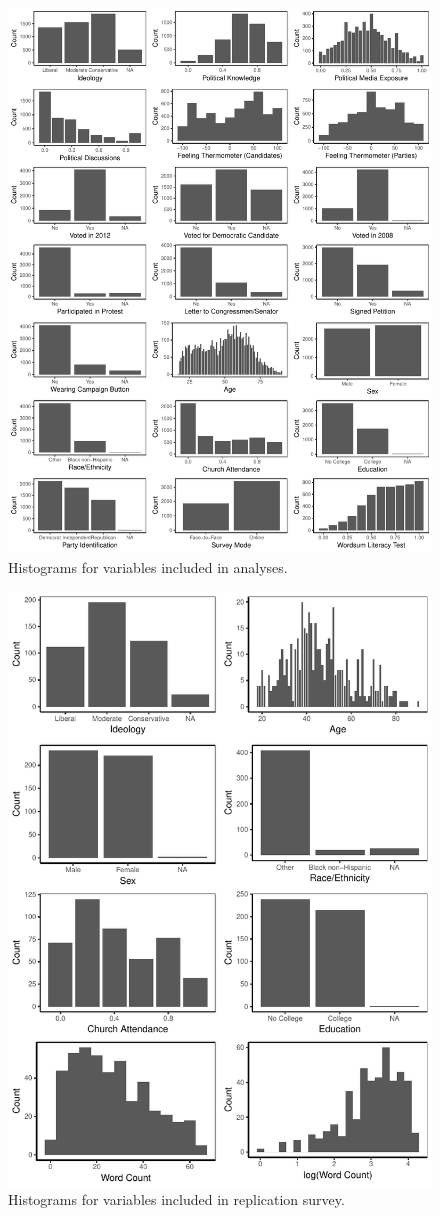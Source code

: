 \documentclass[12pt]{article}
\begin{document}
\begin{figure}[h]\centering
\includegraphics[width=\textwidth]{../calc/fig/app_desc.pdf}
\caption{Histograms for variables included in analyses.}\label{fig:app_desc}
\end{figure}



\begin{figure}[h]\centering
\includegraphics[width=.67\textwidth]{../calc/fig/app_lidesc.pdf}
\caption{Histograms for variables included in replication survey.}\label{fig:app_lidesc}
\end{figure}
\end{document}
